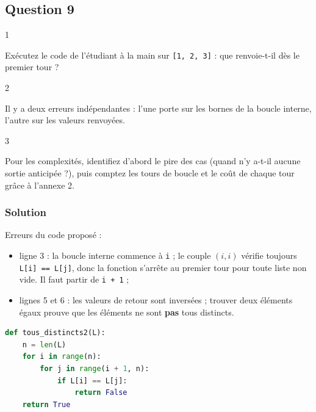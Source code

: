 \documentclass[11pt,a4paper]{article}
\providecommand{\tightlist}{\setlength{\itemsep}{0pt}\setlength{\parskip}{0pt}}
\begin{document}
\hypertarget{question-9}{%
\subsection{Question 9}\label{question-9}}

\begin{indication}{1}

Exécutez le code de l'étudiant à la main sur \texttt{{[}1,\ 2,\ 3{]}} : que renvoie-t-il dès le premier tour ?

\end{indication}

\begin{indication}{2}

Il y a deux erreurs indépendantes : l'une porte sur les bornes de la boucle interne, l'autre sur les valeurs renvoyées.

\end{indication}

\begin{indication}{3}

Pour les complexités, identifiez d'abord le pire des cas (quand n'y a-t-il aucune sortie anticipée ?), puis comptez les tours de boucle et le coût de chaque tour grâce à l'annexe 2.

\end{indication}

\hypertarget{solution-8}{%
\subsubsection{Solution}\label{solution-8}}

Erreurs du code proposé :

\begin{itemize}
\tightlist
\item
  ligne 3 : la boucle interne commence à \texttt{i} ; le couple \((i, i)\) vérifie toujours \texttt{L{[}i{]}\ ==\ L{[}j{]}}, donc la fonction s'arrête au premier tour pour toute liste non vide. Il faut partir de \texttt{i\ +\ 1} ;
\item
  lignes 5 et 6 : les valeurs de retour sont inversées ; trouver deux éléments égaux prouve que les éléments ne sont \textbf{pas} tous distincts.
\end{itemize}

\begin{lstlisting}[language=Python]
def tous_distincts2(L):
    n = len(L)
    for i in range(n):
        for j in range(i + 1, n):
            if L[i] == L[j]:
                return False
    return True
\end{lstlisting}
\end{document}
